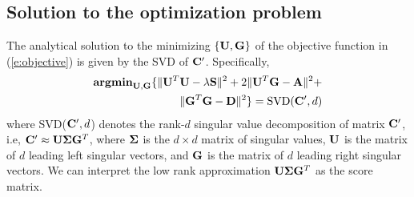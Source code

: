 \subsection{Solution to the optimization problem}
The analytical solution to the minimizing $\left\{ \mathbf{U}, \mathbf{G} \right\}$ of the objective function in (\ref{e:objective}) is given by the SVD of $\mathbf{C}'$. Specifically,
\begin{eqnarray}
 \textbf{argmin}_{\mathbf{U}, \mathbf{G}} \{\|\mathbf{U}^T \mathbf{U} -\lambda \mathbf{S} \|^2 + 2\|\mathbf{U}^T \mathbf{G} -\mathbf{A} \|^2 + \nonumber\\ \|\mathbf{G}^T\mathbf{G} - \mathbf{D}\|^2 \} =  \text{SVD}(\mathbf{C}', d)
\end{eqnarray}
where SVD($\mathbf{C}', d$) denotes the rank-$d$ singular value decomposition of matrix $\mathbf{C}'$, i.e, $\mathbf{C}' \approx \mathbf{U} \boldsymbol{\Sigma} \mathbf{G}^T$, where
$\boldsymbol{\Sigma}$ is the $d \times d$ matrix of singular values, $\mathbf{U}$ is the matrix of $d$ leading left singular vectors, and $\mathbf{G}$ is the matrix of $d$ leading right singular vectors. We can interpret the low rank approximation $\mathbf{U} \boldsymbol{\Sigma} \mathbf{G}^T$ as the score matrix.
